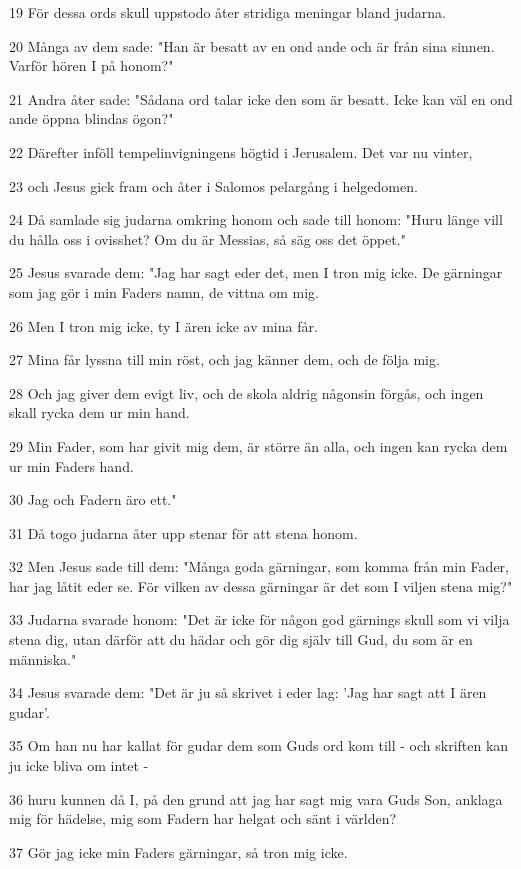 \par 19 För dessa ords skull uppstodo åter stridiga meningar bland judarna.
\par 20 Många av dem sade: "Han är besatt av en ond ande och är från sina sinnen. Varför hören I på honom?"
\par 21 Andra åter sade: "Sådana ord talar icke den som är besatt. Icke kan väl en ond ande öppna blindas ögon?"
\par 22 Därefter inföll tempelinvigningens högtid i Jerusalem. Det var nu vinter,
\par 23 och Jesus gick fram och åter i Salomos pelargång i helgedomen.
\par 24 Då samlade sig judarna omkring honom och sade till honom: "Huru länge vill du hålla oss i ovisshet? Om du är Messias, så säg oss det öppet."
\par 25 Jesus svarade dem: "Jag har sagt eder det, men I tron mig icke. De gärningar som jag gör i min Faders namn, de vittna om mig.
\par 26 Men I tron mig icke, ty I ären icke av mina får.
\par 27 Mina får lyssna till min röst, och jag känner dem, och de följa mig.
\par 28 Och jag giver dem evigt liv, och de skola aldrig någonsin förgås, och ingen skall rycka dem ur min hand.
\par 29 Min Fader, som har givit mig dem, är större än alla, och ingen kan rycka dem ur min Faders hand.
\par 30 Jag och Fadern äro ett."
\par 31 Då togo judarna åter upp stenar för att stena honom.
\par 32 Men Jesus sade till dem: "Många goda gärningar, som komma från min Fader, har jag låtit eder se. För vilken av dessa gärningar är det som I viljen stena mig?"
\par 33 Judarna svarade honom: "Det är icke för någon god gärnings skull som vi vilja stena dig, utan därför att du hädar och gör dig själv till Gud, du som är en människa."
\par 34 Jesus svarade dem: "Det är ju så skrivet i eder lag: 'Jag har sagt att I ären gudar'.
\par 35 Om han nu har kallat för gudar dem som Guds ord kom till - och skriften kan ju icke bliva om intet -
\par 36 huru kunnen då I, på den grund att jag har sagt mig vara Guds Son, anklaga mig för hädelse, mig som Fadern har helgat och sänt i världen?
\par 37 Gör jag icke min Faders gärningar, så tron mig icke.
